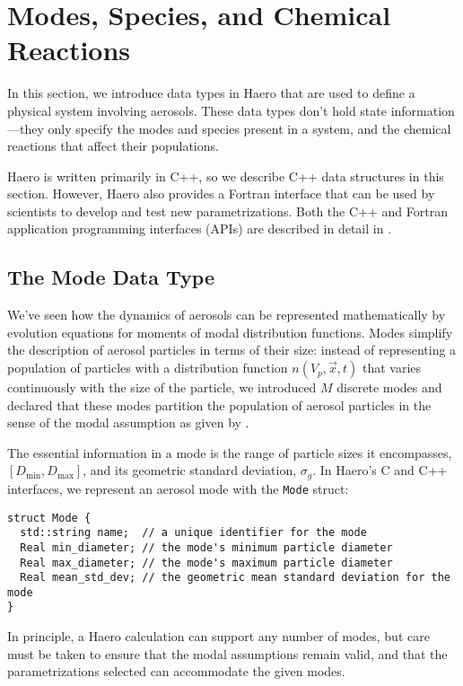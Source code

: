 \section{Modes, Species, and Chemical Reactions}

In this section, we introduce data types in Haero that are used to define a
physical system involving aerosols. These data types don't hold state
information---they only specify the modes and species present in a system,
and the chemical reactions that affect their populations.

Haero is written primarily in C++, so we describe C++ data structures in
this section. However, Haero also provides a Fortran interface that can be
used by scientists to develop and test new parametrizations. Both the C++
and Fortran application programming interfaces (APIs) are described in
detail in .

\subsection{The Mode Data Type}

We've seen how the dynamics of aerosols can be represented mathematically
by evolution equations for moments of modal distribution functions. Modes
simplify the description of aerosol particles in terms of their size: instead of
representing a population of particles with a distribution function
$n(V_p, \vec{x}, t)$ that varies continuously with the size of the particle, we
introduced $M$ discrete modes and declared that these modes partition the
population of aerosol particles in the sense of the modal assumption as given
by .

The essential information in a mode is the range of particle sizes it
encompasses, $[D_{\min}, D_{\max}]$, and its geometric standard deviation,
$\sigma_g$. In Haero's C and C++ interfaces,
we represent an aerosol mode with the \verb|Mode| struct:

\begin{verbatim}
struct Mode {
  std::string name;  // a unique identifier for the mode
  Real min_diameter; // the mode's minimum particle diameter
  Real max_diameter; // the mode's maximum particle diameter
  Real mean_std_dev; // the geometric mean standard deviation for the mode
}
\end{verbatim}

In principle, a Haero calculation can support any number of modes, but care
must be taken to ensure that the modal assumptions remain valid, and that
the parametrizations selected can accommodate the given modes.

